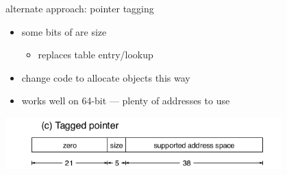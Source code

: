 
\begin{frame}{alternate approach: pointer tagging}
    \begin{itemize}
        \item some bits of  are size 
        \begin{itemize}
        \item replaces table entry/lookup
        \end{itemize}
    \item change code to allocate objects this way
    \item works well on 64-bit --- plenty of addresses to use
    \end{itemize}
    \includegraphics[width=0.8\textwidth]{../bounds/baggy-bounds-tagging}
\end{frame}

